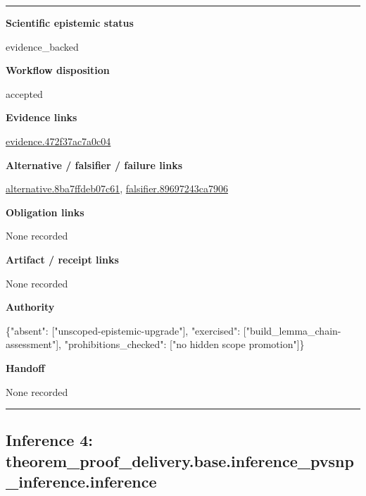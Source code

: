 \documentclass[10pt,a4paper]{article}
\newcommand{\TraceField}[2]{\par\noindent\textbf{#1}\par\noindent #2\par\smallskip}
\newenvironment{TraceDossier}{\par\medskip\noindent\hrule\medskip}{\medskip\hrule\par\medskip}
\begin{document}
\begin{TraceDossier}
\TraceField{Scientific epistemic status}{evidence\_\allowbreak{}backed}

\TraceField{Workflow disposition}{accepted}

\TraceField{Evidence links}{\hyperlink{trace-evidence-06869330fb124f8d69}{evidence.\allowbreak{}472f37ac7a\allowbreak{}0c04}}

\TraceField{Alternative / falsifier / failure links}{\hyperlink{trace-alternative-3b7add1ad15b39fe4c}{alternativ\allowbreak{}e.\allowbreak{}8ba7ffdeb0\allowbreak{}7c61}, \hyperlink{trace-alternative-e82a48c49d51f60814}{falsifier.\allowbreak{}89697243ca\allowbreak{}7906}}

\TraceField{Obligation links}{None recorded}

\TraceField{Artifact / receipt links}{None recorded}

\TraceField{Authority}{\{"absent":\allowbreak{} ["unscoped\allowbreak{}-\allowbreak{}epistemic-\allowbreak{}upgrade"],\allowbreak{} "exercised\allowbreak{}":\allowbreak{} ["build\_\allowbreak{}lemma\_\allowbreak{}chain-\allowbreak{}assessment\allowbreak{}"], "prohibiti\allowbreak{}ons\_\allowbreak{}checked":\allowbreak{} ["no hidden scope promotion"\allowbreak{}]\}}

\TraceField{Handoff}{None recorded}

\end{TraceDossier}
\pagebreak[2]\subsection{Inference 4: theorem\_\allowbreak{}proof\_\allowbreak{}delivery.\allowbreak{}base.\allowbreak{}inference\_\allowbreak{}pvsnp\_\allowbreak{}inference.\allowbreak{}inference}\label{trace-inference-54680125edfde1487b}
\end{document}
